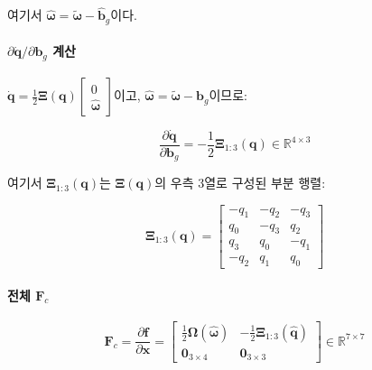 \noindent 여기서 $\hat{\boldsymbol{\omega}} = \tilde{\boldsymbol{\omega}} - \hat{\mathbf{b}}_g$이다.
 
\paragraph{$\partial \dot{\mathbf{q}} / \partial \mathbf{b}_g$ 계산}
 
$\dot{\mathbf{q}} = \frac{1}{2}\boldsymbol{\Xi}(\mathbf{q})\begin{bmatrix}0\\\hat{\boldsymbol{\omega}}\end{bmatrix}$이고,
$\hat{\boldsymbol{\omega}} = \tilde{\boldsymbol{\omega}} - \mathbf{b}_g$이므로:
 
\begin{equation}
    \frac{\partial \dot{\mathbf{q}}}{\partial \mathbf{b}_g} =
    -\frac{1}{2}\boldsymbol{\Xi}_{1:3}(\mathbf{q}) \in \mathbb{R}^{4\times 3}
    \tag{B.3}
\end{equation}
 
\noindent 여기서 $\boldsymbol{\Xi}_{1:3}(\mathbf{q})$는 $\boldsymbol{\Xi}(\mathbf{q})$의
우측 3열로 구성된 부분 행렬:
 
\begin{equation}
    \boldsymbol{\Xi}_{1:3}(\mathbf{q}) =
    \begin{bmatrix}
        -q_1 & -q_2 & -q_3 \\
         q_0 & -q_3 &  q_2 \\
         q_3 &  q_0 & -q_1 \\
        -q_2 &  q_1 &  q_0
    \end{bmatrix}
    \tag{B.4}
\end{equation}
 
\paragraph{전체 $\mathbf{F}_c$}
 
\begin{equation}
    \mathbf{F}_c = \frac{\partial \mathbf{f}}{\partial \mathbf{x}} =
    \begin{bmatrix}
        \frac{1}{2}\boldsymbol{\Omega}(\hat{\boldsymbol{\omega}}) &
        -\frac{1}{2}\boldsymbol{\Xi}_{1:3}(\hat{\mathbf{q}}) \\[6pt]
        \mathbf{0}_{3\times 4} & \mathbf{0}_{3\times 3}
    \end{bmatrix}
    \in \mathbb{R}^{7\times 7}
    \tag{B.5}
\end{equation}
 
